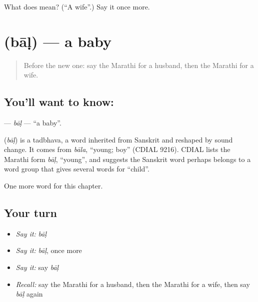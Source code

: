 \begin{tcolorbox}[breakable,colback=teal!4,colframe=teal!35!black,title={Before you move on}]
What does  mean? (\textquotedblleft{}A wife\textquotedblright{}.) Say it once more.
\end{tcolorbox}
\section[\texorpdfstring{\mr{बाळ} (bāḷ)}{बाळ (bāḷ)}]{ (bāḷ) — a baby}

\label{lesson:MR-C76-bal}



\begin{quote}
Before the new one: say the Marathi for a husband, then the Marathi for a wife.
\end{quote}

\subsection*{You'll want to know: }
\textbf{} — \emph{bāḷ} — \textquotedblleft{}a baby\textquotedblright{}.

\begin{cousinweb}
\textbf{} (\emph{bāḷ}) is a tadbhava, a word inherited from Sanskrit and reshaped by sound change. It comes from \emph{bāla}, \textquotedblleft{}young; boy\textquotedblright{} (CDIAL 9216). CDIAL lists the Marathi form \emph{bāḷ}, \textquotedblleft{}young\textquotedblright{}, and suggests the Sanskrit word perhaps belongs to a word group that gives several words for \textquotedblleft{}child\textquotedblright{}.
\end{cousinweb}

\begin{grammarlens}[title={What you've built}]
One more word for this chapter.
\end{grammarlens}

\subsection*{Your turn}
\begin{itemize}
\raggedright
  \item \emph{Say it:} \emph{bāḷ}
  \item \emph{Say it:} \emph{bāḷ}, once more
  \item \emph{Say it:} say \emph{bāḷ}
  \item \emph{Recall:} say the Marathi for a husband, then the Marathi for a wife, then say \emph{bāḷ} again
\end{itemize}

